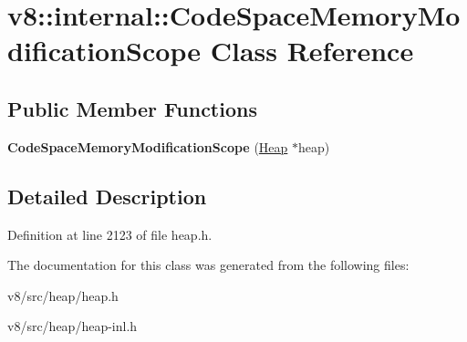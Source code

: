 \hypertarget{classv8_1_1internal_1_1CodeSpaceMemoryModificationScope}{}\section{v8\+:\+:internal\+:\+:Code\+Space\+Memory\+Modification\+Scope Class Reference}
\label{classv8_1_1internal_1_1CodeSpaceMemoryModificationScope}
\subsection*{Public Member Functions}
\begin{DoxyCompactItemize}
\item 
\mbox{\label{classv8_1_1internal_1_1CodeSpaceMemoryModificationScope_a1b8e7d64a356594b9489ee9df7638621}} 
{\bfseries Code\+Space\+Memory\+Modification\+Scope} (\mbox{\hyperlink{classv8_1_1internal_1_1Heap}{Heap}} $\ast$heap)
\end{DoxyCompactItemize}


\subsection{Detailed Description}


Definition at line 2123 of file heap.\+h.



The documentation for this class was generated from the following files\+:\begin{DoxyCompactItemize}
\item 
v8/src/heap/heap.\+h\item 
v8/src/heap/heap-\/inl.\+h\end{DoxyCompactItemize}
